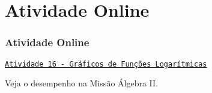 \section{Atividade Online}
\begin{frame}
\frametitle{Atividade Online} 

\href{https://pt.khanacademy.org/math/algebra2/exponential-and-logarithmic-functions/graphs-of-logarithmic-functions/e/graphs-of-exponentials-and-logarithms}
{{\tt Atividade 16 - Gráficos de Funções Logarítmicas}}


Veja o desempenho na Missão Álgebra II.


\end{frame}